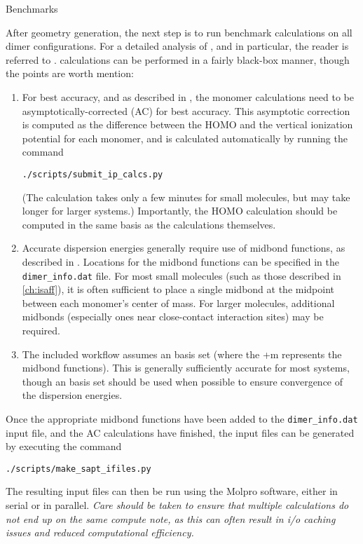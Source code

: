 
\begin{section}{\sapt Benchmarks}
\label{sec:workflow-sapt}

After geometry generation, the next step 
is to run benchmark \dftsapt calculations on all dimer configurations.
For a detailed analysis of \sapt, and \dftsapt in particular, the reader is
referred to 
.
\dftsapt calculations can be performed in a fairly black-box
manner, though the points are worth mention:
\begin{enumerate}
\item For best accuracy, and as described in , the monomer \dft
calculations need to be asymptotically-corrected (AC) for best accuracy. This
asymptotic correction is computed as the difference between the HOMO and the
vertical ionization potential for each monomer, and is calculated
automatically by running the command 
\begin{lstlisting}
./scripts/submit_ip_calcs.py
\end{lstlisting}
(The calculation takes only a few minutes for small molecules, but may take
longer for larger systems.) Importantly, the HOMO calculation should be computed
in the same basis as the \dftsapt calculations themselves.
\item Accurate \sapt dispersion energies generally require use of midbond
functions, as described in . Locations for the midbond functions
can be specified in the \verb|dimer_info.dat| file. For most small molecules
(such as those described in \cref{ch:isaff}), it is
often sufficient to place a single midbond at the midpoint between each
monomer's center of mass. For larger molecules, additional midbonds
(especially ones near close-contact interaction sites) may be required.
\item The included workflow assumes an \avtzm basis set (where the +m represents
the midbond functions). This is generally sufficiently accurate for most
systems, though an \avqzm basis set should be used when possible to ensure
convergence of the \dftsapt dispersion energies.
\end{enumerate}

Once the appropriate midbond functions have been added to the
\verb|dimer_info.dat| input file, and the AC calculations have finished, the
\dftsapt input files can be generated by executing the command

\begin{lstlisting}
./scripts/make_sapt_ifiles.py
\end{lstlisting}

The resulting input files can then be run using the Molpro software, either in
serial or in parallel. \emph{Care should be taken to ensure that multiple
calculations do not end up on the same compute note, as this can often result
in i/o caching issues and reduced computational efficiency.}

\end{section}

